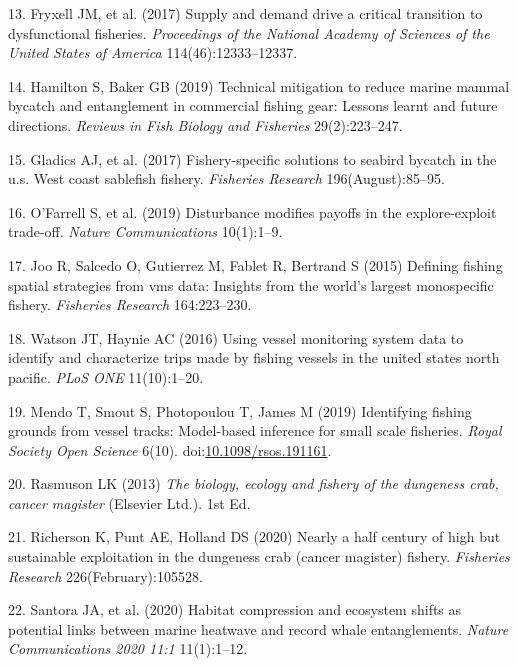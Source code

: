 \documentclass[9pt,twocolumn,twoside,lineno]{pnas-new}
\begin{document}
\leavevmode\hypertarget{ref-Fryxell2017}{}%
13. Fryxell JM, et al. (2017) Supply and demand drive a critical
transition to dysfunctional fisheries. \emph{Proceedings of the National
Academy of Sciences of the United States of America}
114(46):12333--12337.

\leavevmode\hypertarget{ref-Hamilton2019}{}%
14. Hamilton S, Baker GB (2019) Technical mitigation to reduce marine
mammal bycatch and entanglement in commercial fishing gear: Lessons
learnt and future directions. \emph{Reviews in Fish Biology and
Fisheries} 29(2):223--247.

\leavevmode\hypertarget{ref-Gladics2017}{}%
15. Gladics AJ, et al. (2017) Fishery-specific solutions to seabird
bycatch in the u.s. West coast sablefish fishery. \emph{Fisheries
Research} 196(August):85--95.

\leavevmode\hypertarget{ref-OFarrell2019a}{}%
16. O'Farrell S, et al. (2019) Disturbance modifies payoffs in the
explore-exploit trade-off. \emph{Nature Communications} 10(1):1--9.

\leavevmode\hypertarget{ref-Joo2015}{}%
17. Joo R, Salcedo O, Gutierrez M, Fablet R, Bertrand S (2015) Defining
fishing spatial strategies from vms data: Insights from the world's
largest monospecific fishery. \emph{Fisheries Research} 164:223--230.

\leavevmode\hypertarget{ref-Watson2016a}{}%
18. Watson JT, Haynie AC (2016) Using vessel monitoring system data to
identify and characterize trips made by fishing vessels in the united
states north pacific. \emph{PLoS ONE} 11(10):1--20.

\leavevmode\hypertarget{ref-Mendo2019}{}%
19. Mendo T, Smout S, Photopoulou T, James M (2019) Identifying fishing
grounds from vessel tracks: Model-based inference for small scale
fisheries. \emph{Royal Society Open Science} 6(10).
doi:\href{https://doi.org/10.1098/rsos.191161}{10.1098/rsos.191161}.

\leavevmode\hypertarget{ref-Rasmuson2013}{}%
20. Rasmuson LK (2013) \emph{The biology, ecology and fishery of the
dungeness crab, cancer magister} (Elsevier Ltd.). 1st Ed.

\leavevmode\hypertarget{ref-Richerson2020}{}%
21. Richerson K, Punt AE, Holland DS (2020) Nearly a half century of
high but sustainable exploitation in the dungeness crab (cancer
magister) fishery. \emph{Fisheries Research} 226(February):105528.

\leavevmode\hypertarget{ref-Santora2020}{}%
22. Santora JA, et al. (2020) Habitat compression and ecosystem shifts
as potential links between marine heatwave and record whale
entanglements. \emph{Nature Communications 2020 11:1} 11(1):1--12.
\end{document}
